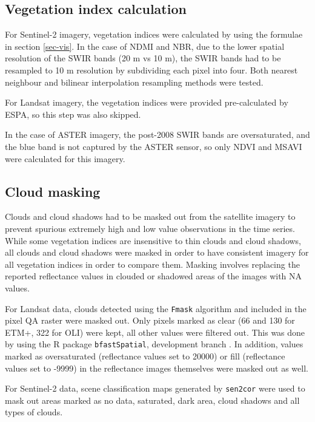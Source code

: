 \documentclass[a4paper,12pt]{scrbook}
\begin{document}
\subsection{Vegetation index calculation}

For Sentinel-2 imagery, vegetation indices were calculated by using the formulae in section \ref{sec-vis}. In the case of \ac{NDMI} and \ac{NBR}, due to the lower spatial resolution of the \ac{SWIR} bands (20 m vs 10 m), the \ac{SWIR} bands had to be resampled to 10 m resolution by subdividing each pixel into four. Both nearest neighbour and bilinear interpolation resampling methods were tested.

For Landsat imagery, the vegetation indices were provided pre-calculated by \ac{ESPA}, so this step was also skipped.

In the case of \ac{ASTER} imagery, the post-2008 \ac{SWIR} bands are oversaturated, and the blue band is not captured by the \ac{ASTER} sensor, so only \ac{NDVI} and \ac{MSAVI} were calculated for this imagery.

\subsection{Cloud masking}

Clouds and cloud shadows had to be masked out from the satellite imagery to prevent spurious extremely high and low value observations in the time series. While some vegetation indices are insensitive to thin clouds and cloud shadows, all clouds and cloud shadows were masked in order to have consistent imagery for all vegetation indices in order to compare them. Masking involves replacing the reported reflectance values in clouded or shadowed areas of the images with \ac{NA} values.

For Landsat data, clouds detected using the \texttt{Fmask} algorithm \citep{zhu_object-based_2012} and included in the pixel QA raster were masked out. Only pixels marked as clear (66 and 130 for \ac{ETM+}, 322 for \ac{OLI}) were kept, all other values were filtered out. This was done by using the R package \texttt{bfastSpatial}, development branch \citep{dutrieux_bfastspatial:_2014}. In addition, values marked as oversaturated (reflectance values set to 20000) or fill (reflectance values set to -9999) in the reflectance images themselves were masked out as well.

For Sentinel-2 data, scene classification maps generated by \texttt{sen2cor} were used to mask out areas marked as no data, saturated, dark area, cloud shadows and all types of clouds.
\end{document}
